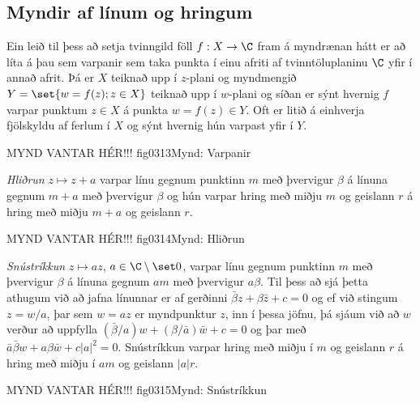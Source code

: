 \subsection*{Myndir af línum og hringum}

Ein  leið til þess að setja tvinngild föll
$f:X\to \C$ fram á myndrænan hátt
er að líta á þau sem varpanir sem taka punkta í einu afriti af
tvinntöluplaninu $\C$ yfir í annað afrit.  Þá er $X$ teiknað upp í
$z$-plani og myndmengið $Y=\set{w=f(z); z\in X}$ 
teiknað upp í $w$-plani og síðan er sýnt
hvernig $f$ varpar punktum $z\in X$ á punkta $w=f(z)\in Y$.
Oft er litið á einhverja fjölskyldu af ferlum í $X$ og sýnt hvernig hún
varpast yfir í $Y$. 


MYND VANTAR HÉR!!! {fig0313}{Mynd: Varpanir}


\smallskip\noindent
{\it Hliðrun}  $z\mapsto z+a$ varpar línu gegnum punktinn $m$ með
þvervigur ${\beta}$  á línuna gegnum $m+a$ með þvervigur ${\beta}$ og
hún varpar hring með miðju $m$ og geislann $r$ á hring með miðju $m+a$
og geislann $r$.



MYND VANTAR HÉR!!! {fig0314}{Mynd: Hliðrun}


\smallskip\noindent
{\it Snústríkkun}
$z\mapsto az$, $a\in \C\setminus \set 0$, varpar línu gegnum
punktinn $m$ með þvervigur ${\beta}$  á línuna gegnum $am$ með
þvervigur $a{\beta}$. Til þess að sjá þetta athugum við að jafna
línunnar er af gerðinni $\bar {\beta} z+{\beta}\bar z+c=0$ og ef við
stingum $z=w/a$, þar sem $w=az$ er myndpunktur $z$, inn í þessa
jöfnu, þá sjáum við að $w$ verður að uppfylla
$(\bar {\beta}/a) w+({\beta}/\bar a)\bar w+c=0$ og þar með
$\bar a\bar {\beta} w+a{\beta}\bar w+c|a|^2=0$.  
Snústríkkun varpar hring með miðju í $m$ og geislann $r$ á hring með
miðju í $am$ og geislann $|a|r$.


MYND VANTAR HÉR!!! {fig0315}{Mynd: Snústríkkun}


